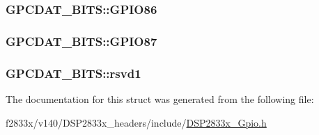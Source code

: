\subsubsection[{G\+P\+I\+O86}]{ G\+P\+C\+D\+A\+T\+\_\+\+B\+I\+T\+S\+::\+G\+P\+I\+O86}\label{struct_g_p_c_d_a_t___b_i_t_s_a354f2d5a68e684cdffd7f1f6290445da}
\hypertarget{struct_g_p_c_d_a_t___b_i_t_s_a69bed0f30c39fee129d30eca0447ae9f}{}
\subsubsection[{G\+P\+I\+O87}]{ G\+P\+C\+D\+A\+T\+\_\+\+B\+I\+T\+S\+::\+G\+P\+I\+O87}\label{struct_g_p_c_d_a_t___b_i_t_s_a69bed0f30c39fee129d30eca0447ae9f}
\hypertarget{struct_g_p_c_d_a_t___b_i_t_s_a1e1ebe67050e39181798e952ab429724}{}
\subsubsection[{rsvd1}]{ G\+P\+C\+D\+A\+T\+\_\+\+B\+I\+T\+S\+::rsvd1}\label{struct_g_p_c_d_a_t___b_i_t_s_a1e1ebe67050e39181798e952ab429724}


The documentation for this struct was generated from the following file\+:\begin{DoxyCompactItemize}
\item 
f2833x/v140/\+D\+S\+P2833x\+\_\+headers/include/\hyperlink{_d_s_p2833x___gpio_8h}{D\+S\+P2833x\+\_\+\+Gpio.\+h}\end{DoxyCompactItemize}
